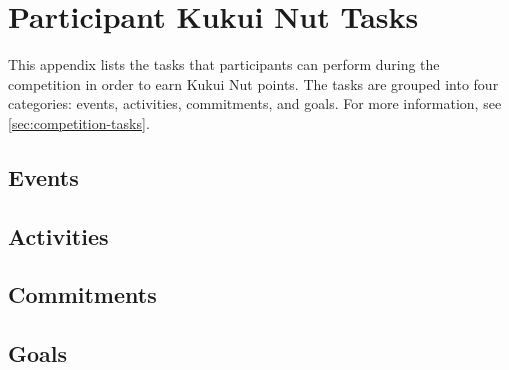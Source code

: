 
\chapter{Participant Kukui Nut Tasks}
\label{app:tasks}

This appendix lists the tasks that participants can perform during the competition in order to earn Kukui Nut points. The tasks are grouped into four categories: events, activities, commitments, and goals. For more information, see \autoref{sec:competition-tasks}.

\section{Events}

\section{Activities}

\section{Commitments}

\section{Goals}
